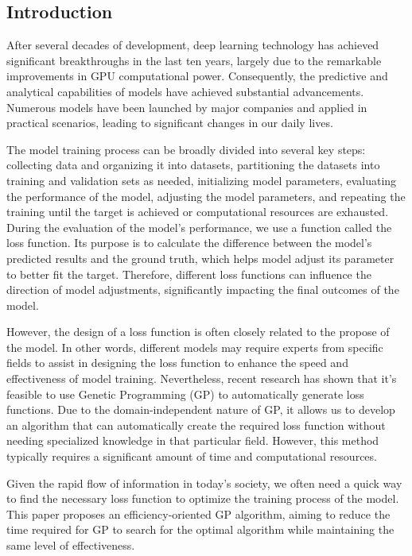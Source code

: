 \begin{ZhChapter}

\chapter{Introduction}

After several decades of development, deep learning technology has achieved significant breakthroughs in the last ten years, largely due to the remarkable improvements in GPU computational power. Consequently, the predictive and analytical capabilities of models have achieved substantial advancements. Numerous models have been launched by major companies and applied in practical scenarios, leading to significant changes in our daily lives.

The model training process can be broadly divided into several key steps: collecting data and organizing it into datasets, partitioning the datasets into training and validation sets as needed, initializing model parameters, evaluating the performance of the model, adjusting the model parameters, and repeating the training until the target is achieved or computational resources are exhausted. During the evaluation of the model's performance, we use a function called the loss function. Its purpose is to calculate the difference between the model's predicted results and the ground truth, which helps model adjust its parameter to better fit the target. Therefore, different loss functions can influence the direction of model adjustments, significantly impacting the final outcomes of the model.

However, the design of a loss function is often closely related to the propose of the model. In other words, different models may require experts from specific fields to assist in designing the loss function to enhance the speed and effectiveness of model training. Nevertheless, recent research has shown that it’s feasible to use Genetic Programming (GP) to automatically generate loss functions. Due to the domain-independent nature of GP, it allows us to develop an algorithm that can automatically create the required loss function without needing specialized knowledge in that particular field. However, this method typically requires a significant amount of time and computational resources.

Given the rapid flow of information in today's society, we often need a quick way to find the necessary loss function to optimize the training process of the model. This paper proposes an efficiency-oriented GP algorithm, aiming to reduce the time required for GP to search for the optimal algorithm while maintaining the same level of effectiveness.


\end{ZhChapter}
